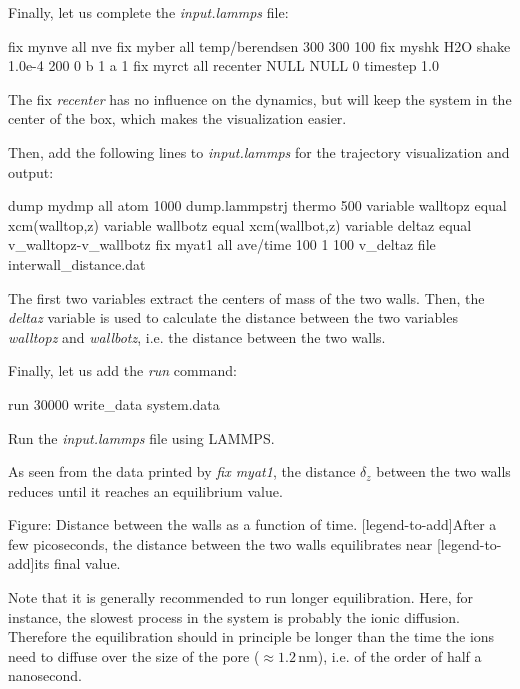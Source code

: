 \noindent Finally, let us complete the \textit{input.lammps} file:

\begin{lcverbatim}
fix mynve all nve
fix myber all temp/berendsen 300 300 100
fix myshk H2O shake 1.0e-4 200 0 b 1 a 1
fix myrct all recenter NULL NULL 0
timestep 1.0
\end{lcverbatim}

\noindent The fix \textit{recenter} has no influence on the dynamics, but will
keep the system in the center of the box, which makes the
visualization easier.

\vspace{0.25cm} \noindent Then, add the following lines to \textit{input.lammps} for
the trajectory visualization and output:

\begin{lcverbatim}
dump mydmp all atom 1000 dump.lammpstrj
thermo 500
variable walltopz equal xcm(walltop,z)
variable wallbotz equal xcm(wallbot,z)
variable deltaz equal v_walltopz-v_wallbotz
fix myat1 all ave/time 100 1 100 v_deltaz file interwall_distance.dat
\end{lcverbatim}

\noindent The first two variables extract the centers of mass of
the two walls. Then, the \textit{deltaz}
variable is used to calculate the distance between
the two variables \textit{walltopz}
and \textit{wallbotz}, i.e. the distance between the two walls.

\vspace{0.25cm} \noindent Finally, let us add the \textit{run} command: 

\begin{lcverbatim}
run 30000
write_data system.data  
\end{lcverbatim}

\noindent Run the \textit{input.lammps} file using LAMMPS.

\vspace{0.25cm} \noindent As seen from the data printed by \textit{fix myat1},
the distance $\delta_z$ between the two walls
reduces until it reaches an equilibrium value.

\vspace{0.25cm} Figure: Distance between the walls as a function of time.
[legend-to-add]After a few picoseconds, the distance between the two walls equilibrates near
[legend-to-add]its final value. 

\vspace{0.25cm} \noindent Note that it is generally recommended to run longer equilibration.
Here, for instance, the slowest
process in the system is probably the ionic diffusion. Therefore the equilibration 
should in principle be longer than the time
the ions need to diffuse over the size of the pore
($\approx 1.2\,\text{nm}$), i.e. of the order of half a nanosecond.

